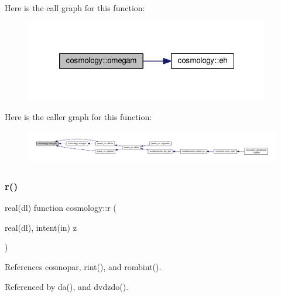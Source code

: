 Here is the call graph for this function\+:
\nopagebreak
\begin{figure}[H]
\begin{center}
\leavevmode
\includegraphics[width=304pt]{namespacecosmology_aeef992799f00205f3a31ac86d34da7e2_cgraph}
\end{center}
\end{figure}
Here is the caller graph for this function\+:
\nopagebreak
\begin{figure}[H]
\begin{center}
\leavevmode
\includegraphics[width=350pt]{namespacecosmology_aeef992799f00205f3a31ac86d34da7e2_icgraph}
\end{center}
\end{figure}
\mbox{\label{namespacecosmology_a5acb8c4886ff7017542c3c1ec551f357}} 
\subsubsection{\texorpdfstring{r()}{r()}}
{\footnotesize\ttfamily real(dl) function cosmology\+::r (\begin{DoxyParamCaption}\item[{real(dl), intent(in)}]{z }\end{DoxyParamCaption})}



References cosmopar, rint(), and rombint().



Referenced by da(), and dvdzdo().

